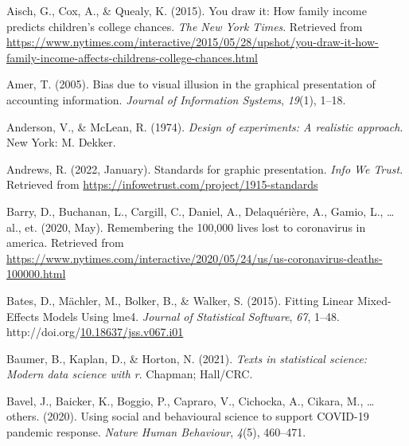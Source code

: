 \documentclass[print]{nuthesis}
\newlength{\cslhangindent}
\newenvironment{CSLReferences}[2]%
{\setlength{\parindent}{0pt}%
\everypar{\setlength{\hangindent}{\cslhangindent}}\ignorespaces}%
{\par}
\begin{document}
\noindent

\setlength{\parindent}{-0.20in}
\setlength{\leftskip}{0.20in}
\setlength{\parskip}{8pt}

\hypertarget{refs}{}
\begin{CSLReferences}{1}{0}
\leavevmode{}%
Aisch, G., Cox, A., \& Quealy, K. (2015). You draw it: How family income predicts children's college chances. \emph{The New York Times}. Retrieved from \url{https://www.nytimes.com/interactive/2015/05/28/upshot/you-draw-it-how-family-income-affects-childrens-college-chances.html}

\leavevmode{}%
Amer, T. (2005). Bias due to visual illusion in the graphical presentation of accounting information. \emph{Journal of Information Systems}, \emph{19}(1), 1--18.

\leavevmode{}%
Anderson, V., \& McLean, R. (1974). \emph{Design of experiments: A realistic approach}. New York: M. Dekker.

\leavevmode{}%
Andrews, R. (2022, January). Standards for graphic presentation. \emph{Info We Trust}. Retrieved from \url{https://infowetrust.com/project/1915-standards}

\leavevmode{}%
Barry, D., Buchanan, L., Cargill, C., Daniel, A., Delaquérière, A., Gamio, L., \ldots{} al., et. (2020, May). Remembering the 100,000 lives lost to coronavirus in america. Retrieved from \url{https://www.nytimes.com/interactive/2020/05/24/us/us-coronavirus-deaths-100000.html}

\leavevmode{}%
Bates, D., Mächler, M., Bolker, B., \& Walker, S. (2015). Fitting {Linear} {Mixed}-{Effects} {Models} {Using} lme4. \emph{Journal of Statistical Software}, \emph{67}, 1--48. http://doi.org/\href{https://doi.org/10.18637/jss.v067.i01}{10.18637/jss.v067.i01}

\leavevmode{}%
Baumer, B., Kaplan, D., \& Horton, N. (2021). \emph{Texts in statistical science: Modern data science with r}. Chapman; Hall/CRC.

\leavevmode{}%
Bavel, J., Baicker, K., Boggio, P., Capraro, V., Cichocka, A., Cikara, M., \ldots{} others. (2020). Using social and behavioural science to support COVID-19 pandemic response. \emph{Nature Human Behaviour}, \emph{4}(5), 460--471.


\end{CSLReferences}
\end{document}
